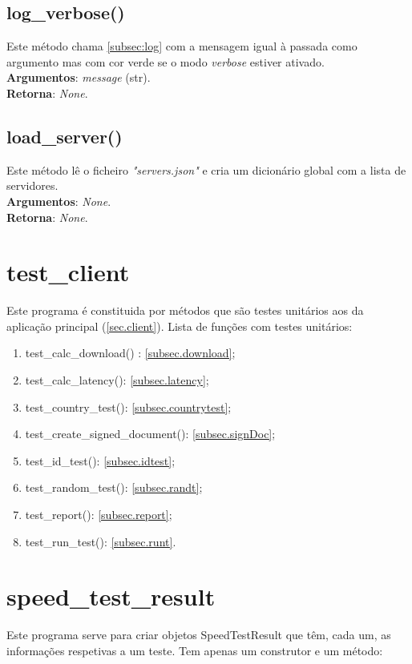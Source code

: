 \documentclass{report}
\begin{document}
\subsection{log\_verbose()}
Este método chama \autoref{subsec:log} com a mensagem igual à passada como argumento mas com cor verde se o modo \textit{verbose} estiver ativado.\\ 
\textbf{Argumentos}:
\textit{message} (str).\\
\textbf{Retorna}: \textit{None}.

\subsection{load\_server()}
\label{subsec:loadserver}
Este método lê o ficheiro \textit{"servers.json"} e cria um dicionário global com a lista de servidores.\\
\textbf{Argumentos}:
\textit{None}.\\
\textbf{Retorna}: \textit{None}.

\section{test\_client}
Este programa é constituida por métodos que são testes unitários aos da aplicação principal (\autoref{sec.client}). Lista de funções com testes unitários:
\begin{enumerate}
\item test\_calc\_download() : \autoref{subsec.download};
\item test\_calc\_latency(): \autoref{subsec.latency};
\item test\_country\_test(): \autoref{subsec.countrytest};
\item test\_create\_signed\_document(): \autoref{subsec.signDoc};
\item test\_id\_test(): \autoref{subsec.idtest};
\item test\_random\_test(): \autoref{subsec.randt};
\item test\_report(): \autoref{subsec.report};
\item test\_run\_test(): \autoref{subsec.runt}.
\end{enumerate}

\section{speed\_test\_result}
Este programa serve para criar objetos SpeedTestResult que têm, cada um, as informações respetivas a um teste. Tem apenas um construtor e um método:
\end{document}
